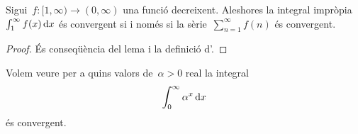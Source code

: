 \documentclass[../analisi-matematica.tex]{subfiles}
\begin{document}
    \begin{solution}
    \end{solution}
    \begin{theorem}
        \label{thm:criteri-de-la-integral-per-integrals-impropies}
        Sigui~\(f\colon[1,\infty)\longrightarrow(0,\infty)\) una funció decreixent.
        Aleshores la integral impròpia~\(\int_{1}^{\infty}f(x)\mathop{}\!\mathrm{d} x\) és convergent si i només si la sèrie~\(\sum_{n=1}^{\infty}f(n)\) és convergent.
    \end{theorem}
    \begin{proof}
        És conseqüència del lema  i la definició d'.
    \end{proof}
    \begin{example}
        \label{ex:criteri-de-la-integral-per-integrals-impropies}
        Volem veure per a quins valors de~\(\alpha>0\) real la integral
        \begin{equation}
            \label{ex:criteri-de-la-integral-per-integrals-impropies:eq1}
            \int_{0}^{\infty}\alpha^{x}\mathop{}\!\mathrm{d} x
        \end{equation}
        és convergent.
    \end{example}
    \begin{solution}
    \end{solution}
\end{document}
